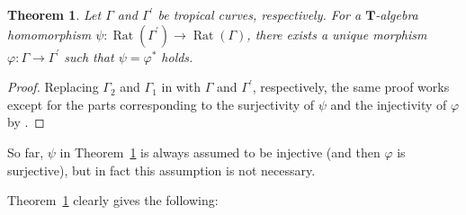 \documentclass[a4paper,12pt]{amsart}
\newtheorem{thm}[dfn]{Theorem}
\def\Gamma{\varGamma}
\begin{document}
\begin{thm}
    \label{thm3-1-1}
Let $\Gamma$ and $\Gamma^{\prime}$ be tropical curves, respectively.
For a $\boldsymbol{T}$-algebra homomorphism $\psi : \operatorname{Rat}(\Gamma^{\prime}) \to \operatorname{Rat}(\Gamma)$, there exists a unique morphism $\varphi : \Gamma \to \Gamma^{\prime}$ such that $\psi = \varphi^{\ast}$ holds.
\end{thm}

\begin{proof}
Replacing $\Gamma_2$ and $\Gamma_1$ in \cite[Corollary~A1 and its proof]{JuAe4} with $\Gamma$ and $\Gamma^{\prime}$, respectively, the same proof works except for the parts corresponding to the surjectivity of $\psi$ and the injectivity of $\varphi$ by \cite[Theorem~3.14]{JuAe4}.
\end{proof}

So far, $\psi$ in Theorem~\ref{thm3-1-1} is always assumed to be injective (and then $\varphi$ is surjective), but in fact this assumption is not necessary.

Theorem~\ref{thm3-1-1} clearly gives the following:
\end{document}
